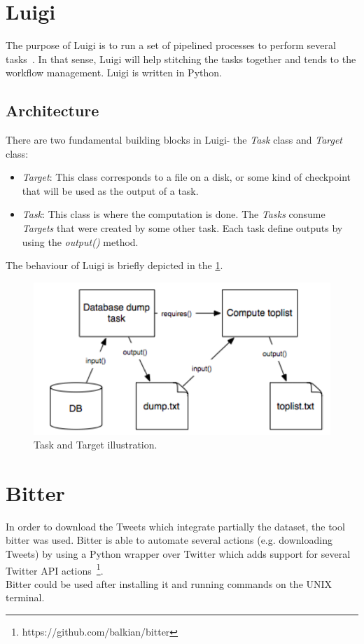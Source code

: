\section{Luigi}
The purpose of Luigi is to run a set of pipelined processes to perform several tasks~\cite{luigi}. In that sense, Luigi will help stitching the tasks together and tends to the workflow management. Luigi is written in Python.\par
\subsection{Architecture}
There are two fundamental building blocks in Luigi- the \textit{Task} class and \textit{Target} class:
\begin{itemize}
	\item \textit{Target}: This class corresponds to a file on a disk, or some kind of checkpoint that will be used as the output of a task.
	\item \textit{Task}: This class is where the computation is done. The \textit{Tasks} consume \textit{Targets} that were created by some other task. Each task define outputs by using the \textit{output()} method. 
\end{itemize}
The behaviour of Luigi is briefly depicted in the \cref{fig:luigytask}.
\begin{figure}
	\includegraphics[width=\linewidth]{img/luigi_tasks.png}
	\caption{Task and Target illustration.~\cite{luigi}}
	\label{fig:luigytask}
\end{figure}
\section{Bitter}
\label{sec:bitter}
In order to download the Tweets which integrate partially the dataset, the tool bitter was used. Bitter is able to automate several actions (e.g. downloading Tweets) by using a Python wrapper over Twitter which adds support for several Twitter API actions~\footnote{https://github.com/balkian/bitter}.\\
Bitter could be used after installing it and running commands on the UNIX terminal.
